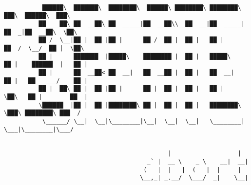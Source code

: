 \documentclass[varwidth=\maxdimen,margin=0.5cm,multi={verbatim}]{standalone}
\begin{document}
\begin{verbatim}

           ██████\  ███████\  ████████\  ██████\ ████████\ ████████\      ███\  ██████\  ███\
          ██  __██\ ██  __██\ ██  _____|██  __██\\__██  __|██  _____|    ██  _|██  __██\  \██\
          ██ /  \__|██ |  ██ |██ |      ██ /  ██ |  ██ |   ██ |         ██  /  \__/  ██ |  \██\
          ██ |      ███████  |█████\    ████████ |  ██ |   █████\       ██ |    ██████  |   ██ |
          ██ |      ██  __██< ██  __|   ██  __██ |  ██ |   ██  __|      ██ |   ██  ____/    ██ |
          ██ |  ██\ ██ |  ██ |██ |      ██ |  ██ |  ██ |   ██ |         \██\   ██ |        ██  |
          \██████  |██ |  ██ |████████\ ██ |  ██ |  ██ |   ████████\     \███\ ████████\ ███  /
           \______/ \__|  \__|\________|\__|  \__|  \__|   \________|      \___|\________|\___/


                                               |                   |
                                         _` |  __ \    _ \    __|  __|
                                        (   |  |   |  (   |  |     |
                                       \__,_| _.__/  \___/  _|    \__|



\end{verbatim}
\end{document}
